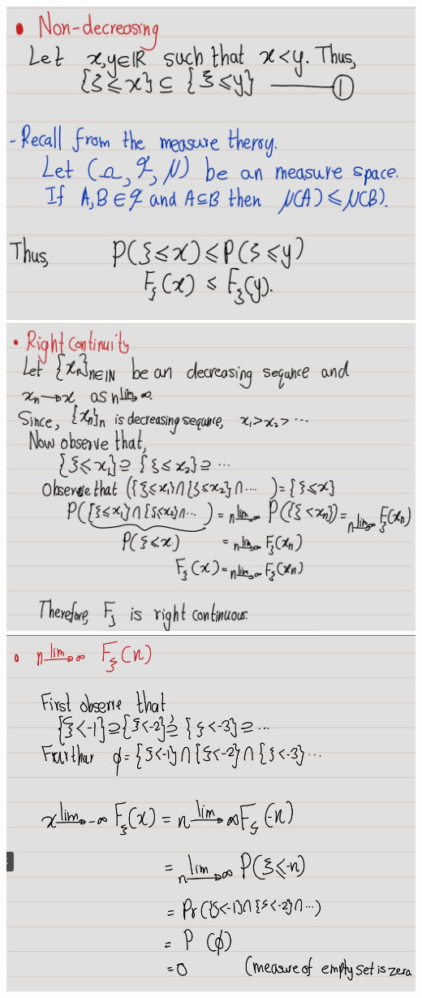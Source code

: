 \documentclass[
]{book}
\theoremstyle{definition}
\theoremstyle{definition}
\theoremstyle{definition}
\theoremstyle{definition}
\theoremstyle{remark}
\begin{document}
\includegraphics[width=18cm,height=\textheight]{fig/fig ex1.4-1.png}
\includegraphics[width=18cm,height=\textheight]{fig/fig ex1.4-2.png}
\includegraphics[width=18cm,height=\textheight]{fig/fig ex1.4-3.png}
\end{document}
